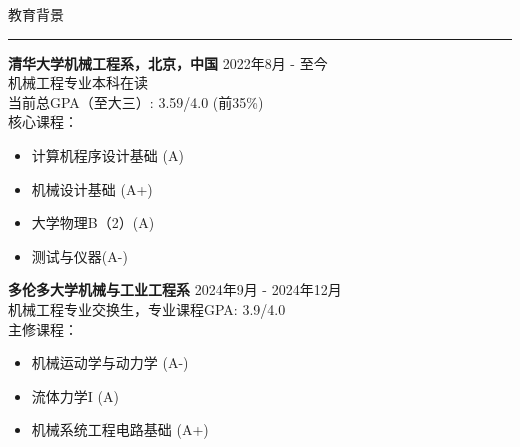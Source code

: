 \documentclass{resume} %
\renewenvironment{rSection}[1]{
\sectionskip
\textcolor{TsinghuaPurple}{\MakeUppercase{#1}}
\sectionlineskip
\hrule
\begin{list}{}{
\setlength{\leftmargin}{0em}
}
\item[]
}{
\end{list}
}
\begin{document}
  


\begin{rSection}{教育背景}

{\bf 清华大学机械工程系，北京，中国} \hfill {2022年8月 - 至今}
\\ 
机械工程专业本科在读
\\
当前总GPA（至大三）: 3.59/4.0 (前35\%)
\\
核心课程：
\begin{itemize}[itemsep = -0.5em, topsep = -0.5em]
    \item 计算机程序设计基础 (A)
    \item 机械设计基础 (A+)
    \item 大学物理B（2）(A)
    \item 测试与仪器(A-)
\end{itemize}

\vspace{11pt}

{\bf 多伦多大学机械与工业工程系} \hfill {2024年9月 - 2024年12月}
\\ 
机械工程专业交换生，专业课程GPA: 3.9/4.0
\\
主修课程：
\begin{itemize}[itemsep = -0.5em, topsep = -0.5em]
    \item 机械运动学与动力学 (A-)
    \item 流体力学I (A)
    \item 机械系统工程电路基础 (A+)
\end{itemize}

\end{rSection} 

\end{document}
